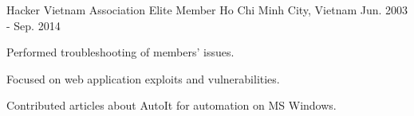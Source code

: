


\begin{cventries}


\cventry
{Hacker Vietnam Association}
{Elite Member}
{Ho Chi Minh City, Vietnam}
{Jun. 2003 - Sep. 2014}
{
\begin{cvitems}
\item {Performed troubleshooting of members' issues.}
\item {Focused on web application exploits and vulnerabilities.}
\item {Contributed articles about AutoIt for automation on MS Windows.}
\end{cvitems}
}


\end{cventries}